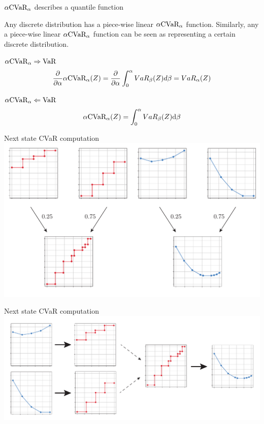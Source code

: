 \documentclass{beamer}
\begin{document}
\begin{frame}{$\alpha\text{CVaR}_\alpha$ describes a quantile function}
\begin{lemma}
Any discrete distribution has a piece-wise linear $\alpha\text{CVaR}_\alpha$ function. Similarly, any a piece-wise linear $\alpha\text{CVaR}_\alpha$ function can be seen as representing a certain discrete distribution.
\end{lemma}

\begin{block}{$\alpha\text{CVaR}_\alpha 	\Rightarrow\text{VaR}$}
$$\dfrac{\partial}{\partial \alpha} \alpha \text{CVaR}_\alpha(Z) = \dfrac{\partial}{\partial \alpha} \int_0^\alpha VaR_\beta(Z) d\beta = VaR_\alpha(Z)$$
\end{block}


\begin{block}{$\alpha\text{CVaR}_\alpha \Leftarrow  \text{VaR}$}
$$\alpha \text{CVaR}_\alpha(Z) = \int_0^\alpha VaR_\beta(Z) \text{d} \beta$$
\end{block}

\end{frame}


\begin{frame}{Next state CVaR computation}
\center
\includegraphics[width=\linewidth]{../gfx/multivarvar.pdf}
\end{frame}


\begin{frame}{Next state CVaR computation}
\center
\includegraphics[width=\linewidth]{../gfx/cvar_vi_conversion.pdf}
\end{frame}
\end{document}
